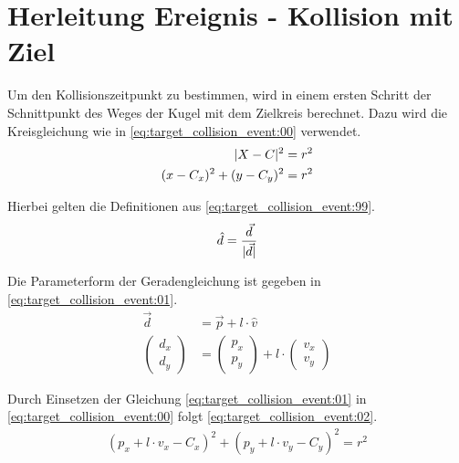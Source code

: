 \section{Herleitung Ereignis - Kollision mit Ziel}\label{anhang:herleitung:event:targetCollision}
Um den Kollisionszeitpunkt zu bestimmen, wird in einem ersten Schritt der Schnittpunkt des Weges der Kugel mit
dem Zielkreis berechnet. Dazu wird die Kreisgleichung wie in \ref{eq:target_collision_event:00} verwendet.
\begin{align}
    \lvert X - C \rvert^2 &= r^2\\
    (x - C_x)^2 + (y - C_y)^2 &= r^2\label{eq:target_collision_event:00}
\end{align}

Hierbei gelten die Definitionen aus \ref{eq:target_collision_event:99}.
\begin{align}
    \hat{d} = \frac{\vec{d}}{\lvert \vec{d} \rvert}\label{eq:target_collision_event:99}
\end{align}

Die Parameterform der Geradengleichung ist gegeben in \ref{eq:target_collision_event:01}.
\begin{align}
    \vec{d} &= \vec{p} + l \cdot \hat{v}\\
    \begin{pmatrix}d_{x}\\d_{y}\end{pmatrix} &= \begin{pmatrix}p_{x}\\p_{y}\end{pmatrix} + l \cdot \begin{pmatrix}v_{x}\\v_{y}\end{pmatrix}\label{eq:target_collision_event:01}
\end{align}

Durch Einsetzen der Gleichung \ref{eq:target_collision_event:01} in \ref{eq:target_collision_event:00} folgt \ref{eq:target_collision_event:02}.
\begin{align}
    (p_x + l \cdot v_x - C_x)^2 + (p_y + l \cdot v_y - C_y)^2 = r^2\label{eq:target_collision_event:02}
\end{align}

